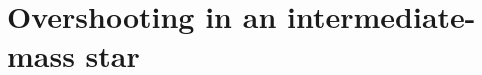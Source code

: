 \documentclass[11pt,a4paper]{article}
\begin{document}















\section{Overshooting in an intermediate-mass star}
\end{document}
